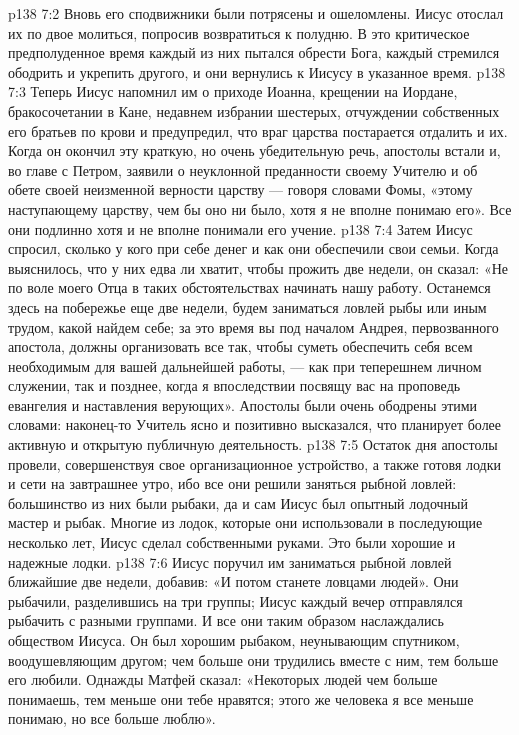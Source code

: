 \vs p138 7:2 Вновь его сподвижники были потрясены и ошеломлены. Иисус отослал их по двое молиться, попросив возвратиться к полудню. В это критическое предполуденное время каждый из них пытался обрести Бога, каждый стремился ободрить и укрепить другого, и они вернулись к Иисусу в указанное время.
\vs p138 7:3 Теперь Иисус напомнил им о приходе Иоанна, крещении на Иордане, бракосочетании в Кане, недавнем избрании шестерых, отчуждении собственных его братьев по крови и предупредил, что враг царства постарается отдалить и их. Когда он окончил эту краткую, но очень убедительную речь, апостолы встали и, во главе с Петром, заявили о неуклонной преданности своему Учителю и об обете своей неизменной верности царству --- говоря словами Фомы, «этому наступающему царству, чем бы оно ни было, хотя я не вполне понимаю его». Все они подлинно  хотя и не вполне понимали его учение.
\vs p138 7:4 Затем Иисус спросил, сколько у кого при себе денег и как они обеспечили свои семьи. Когда выяснилось, что у них едва ли хватит, чтобы прожить две недели, он сказал: «Не по воле моего Отца в таких обстоятельствах начинать нашу работу. Останемся здесь на побережье еще две недели, будем заниматься ловлей рыбы или иным трудом, какой найдем себе; за это время вы под началом Андрея, первозванного апостола, должны организовать все так, чтобы суметь обеспечить себя всем необходимым для вашей дальнейшей работы, --- как при теперешнем личном служении, так и позднее, когда я впоследствии посвящу вас на проповедь евангелия и наставления верующих». Апостолы были очень ободрены этими словами: наконец\hyp{}то Учитель ясно и позитивно высказался, что планирует более активную и открытую публичную деятельность.
\vs p138 7:5 Остаток дня апостолы провели, совершенствуя свое организационное устройство, а также готовя лодки и сети на завтрашнее утро, ибо все они решили заняться рыбной ловлей: большинство из них были рыбаки, да и сам Иисус был опытный лодочный мастер и рыбак. Многие из лодок, которые они использовали в последующие несколько лет, Иисус сделал собственными руками. Это были хорошие и надежные лодки.
\vs p138 7:6 Иисус поручил им заниматься рыбной ловлей ближайшие две недели, добавив: «И потом станете ловцами людей». Они рыбачили, разделившись на три группы; Иисус каждый вечер отправлялся рыбачить с разными группами. И все они таким образом наслаждались обществом Иисуса. Он был хорошим рыбаком, неунывающим спутником, воодушевляющим другом; чем больше они трудились вместе с ним, тем больше его любили. Однажды Матфей сказал: «Некоторых людей чем больше понимаешь, тем меньше они тебе нравятся; этого же человека я все меньше понимаю, но все больше люблю».
